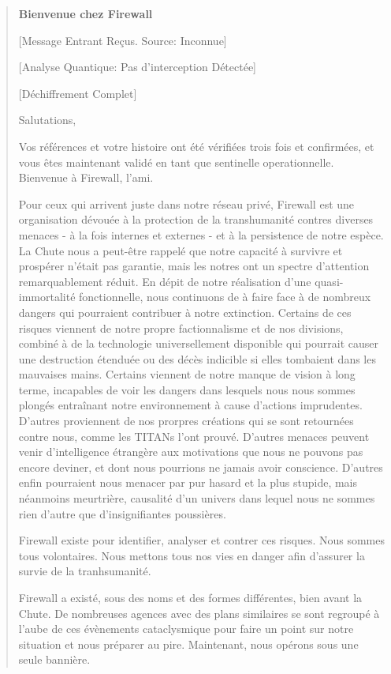 \begin{quotation} 

\textbf{Bienvenue chez Firewall} 

[Message Entrant Reçus. Source: Inconnue] 

[Analyse Quantique: Pas d'interception Détectée] 

[Déchiffrement Complet] 

Salutations, 

Vos références et votre histoire ont été vérifiées trois fois et confirmées, et
vous êtes maintenant validé en tant que sentinelle operationnelle. Bienvenue à
Firewall, l'ami. 

Pour ceux qui arrivent juste dans notre réseau privé, Firewall est une
organisation dévouée à la protection de la transhumanité contres diverses
menaces - à la fois internes et externes - et à la persistence de notre espèce.
La Chute nous a peut-être rappelé que notre capacité à survivre et prospérer
n'était pas garantie, mais les notres ont un spectre d'attention
remarquablement réduit. En dépit de notre réalisation d'une quasi-immortalité
fonctionnelle, nous continuons de à faire face à de nombreux dangers qui
pourraient contribuer à notre extinction. Certains de ces risques viennent de
notre propre factionnalisme et de nos divisions, combiné à de la technologie
universellement disponible qui pourrait causer une destruction étenduée ou des
décès indicible si elles tombaient dans les mauvaises mains. Certains viennent
de notre manque de vision à long terme, incapables de voir les dangers dans
lesquels nous nous sommes plongés entraînant notre environnement à cause
d'actions imprudentes.  D'autres proviennent de nos prorpres créations qui se
sont retournées contre nous, comme les TITANs l'ont prouvé. D'autres menaces
peuvent venir d'intelligence étrangère aux motivations que nous ne pouvons pas
encore deviner, et dont nous pourrions ne jamais avoir conscience. D'autres
enfin pourraient nous menacer par pur hasard et la plus stupide, mais néanmoins
meurtrière, causalité d'un univers dans lequel nous ne sommes rien d'autre que
d'insignifiantes poussières. 

Firewall existe pour identifier, analyser et contrer ces risques. Nous sommes
tous volontaires. Nous mettons tous nos vies en danger afin d'assurer la survie
de la tranhsumanité. 

Firewall a existé, sous des noms et des formes différentes, bien avant la
Chute. De nombreuses agences avec des plans similaires se sont regroupé à
l'aube de ces évènements cataclysmique pour faire un point sur notre situation
et nous préparer au pire. Maintenant, nous opérons sous une seule bannière. 


\end{quotation}
